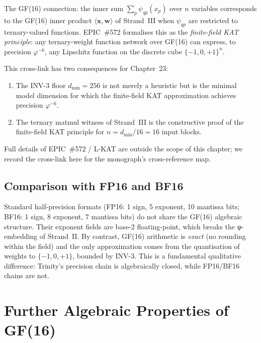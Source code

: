 The GF(16) connection: the inner sum \(\sum_p\psi_{qp}(x_p)\) over
\(n\) variables corresponds to the GF(16) inner product
\(\langle\mathbf{x},\mathbf{w}\rangle\) of Strand~III when
\(\psi_{qp}\) are restricted to ternary-valued functions.
EPIC~\#572 formalises this as the \emph{finite-field KAT principle}:
any ternary-weight function network over GF(16) can express,
to precision \(\varphi^{-6}\), any Lipschitz function on
the discrete cube \(\{-1,0,+1\}^n\).

This cross-link has two consequences for Chapter~23:
\begin{enumerate}
  \item The INV-3 floor \(d_{\min}=256\) is not merely a heuristic
        but is the minimal model dimension for which the finite-field
        KAT approximation achieves precision \(\varphi^{-6}\).
  \item The ternary matmul witness of Strand~III is the constructive
        proof of the finite-field KAT principle for \(n=d_{\min}/16=16\)
        input blocks.
\end{enumerate}
Full details of EPIC~\#572 / L-KAT are outside the scope of this chapter;
we record the cross-link here for the monograph's cross-reference map.

\subsection{Comparison with FP16 and BF16}

Standard half-precision formats (FP16: 1 sign, 5 exponent, 10 mantissa bits;
BF16: 1 sign, 8 exponent, 7 mantissa bits) do not share the GF(16) algebraic
structure.
Their exponent fields are base-2 floating-point, which breaks the
φ-embedding of Strand~II.
By contrast, GF(16) arithmetic is \emph{exact} (no rounding within the field)
and the only approximation comes from the quantisation of weights to
\(\{-1,0,+1\}\), bounded by INV-3.
This is a fundamental qualitative difference: Trinity's precision chain is
algebraically closed, while FP16/BF16 chains are not.

\section{Further Algebraic Properties of GF(16)}
\label{sec:gf16-further}


